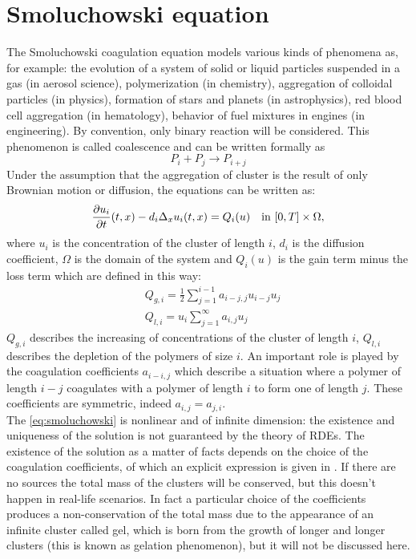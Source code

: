 \section{Smoluchowski equation}
The Smoluchowski coagulation equation models various kinds of phenomena as, for example: the evolution of a system of solid or liquid particles suspended in a gas (in
aerosol science), polymerization (in chemistry), aggregation of colloidal particles (in physics), formation of stars and planets (in astrophysics), red blood cell aggregation (in
hematology), behavior of fuel mixtures in engines (in engineering). By convention, only binary reaction will be considered.
This phenomenon is called coalescence and can be written formally as 
\[
    P_i + P_j \rightarrow P_{i+j}
\]
Under the assumption that the aggregation of cluster is the result of only Brownian motion or diffusion, the equations can be written as:
\begin{equation}
    \frac{\partial u_i}{\partial t}(t,x) - d_i \Delta_x u_i(t,x) = Q_i(u) \quad \text{in } [0,T] \times \Omega,
    \label{eq:smoluchowski}
\end{equation}
where \(u_i\) is the concentration of the cluster of length \(i\), \(d_i\) is the diffusion coefficient, \(\Omega\) is the domain of the system and \(Q_i(u)\) is the gain term minus the loss term which  are defined in this way:
\begin{equation*}
    \begin{aligned}
    &Q_{g, i}=\frac{1}{2} \sum_{j=1}^{i-1} a_{i-j, j} u_{i-j} u_{j} \\
    &Q_{l, i}=u_{i} \sum_{j=1}^{\infty} a_{i, j} u_{j}
    \end{aligned}
\end{equation*}
$Q_{g,i}$ describes the increasing of concentrations of the cluster of length $i$,
$Q_{l,i}$ describes the depletion of the polymers of size $i$.
An important role is played by the coagulation coefficients $a_{i-i,j}$ which describe a situation where a polymer of length $i-j$ coagulates with a polymer of length $i$ to form one of length $j$. These coefficients are symmetric, indeed $a_{i,j}=a_{j,i}$.\\
The \eqref{eq:smoluchowski} is nonlinear and of infinite dimension: the existence and uniqueness of the solution is not guaranteed by the theory of RDEs. The existence of the solution as a matter of facts depends on the choice of the coagulation coefficients, of which an explicit expression is given in \cite{Bertsch}.
If there are no sources the total mass of the clusters will be conserved, but this doesn't happen in real-life scenarios. In fact a particular choice of the coefficients produces a non-conservation of the total mass due to the appearance of an infinite cluster called gel, which is born from the growth of longer and longer clusters (this is known as gelation phenomenon), but it will not be discussed here.